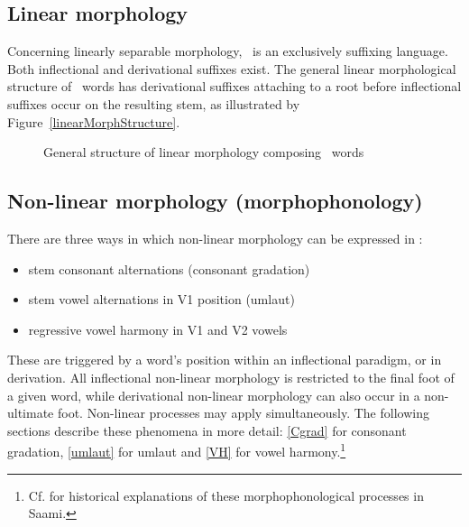 \FB

\subsection{Linear morphology}\label{linearMorphology}
Concerning linearly separable morphology, \PS\ is an exclusively suffixing language. Both inflectional and derivational suffixes exist. %
The general linear morphological structure of \PS\ words has derivational suffixes attaching to a root before inflectional suffixes occur on the resulting stem, as illustrated by %
Figure~\vref{linearMorphStructure}.
\begin{figure}[h]
\caption{General structure of linear morphology composing \PS\ words}\label{linearMorphStructure}
\end{figure}
%


\subsection{Non-linear morphology (morphophonology)}\label{morphophonology}
There are three ways %
in which non-linear morphology can be expressed in \PS:
\begin{itemize}
\item{stem consonant alternations (consonant gradation)}
\item{stem vowel alternations in V1 position (umlaut)}
\item{regressive vowel harmony in V1 and V2 vowels}
\end{itemize}
These are triggered by a word’s position %
within an inflectional paradigm, or in derivation. All inflectional non-linear morphology is restricted to the final foot of a given word, while derivational non-linear morphology can also occur in a non-ultimate foot. Non-linear processes may apply simultaneously. The following sections describe these phenomena in more detail: \SEC\ref{Cgrad} for consonant gradation, \SEC\ref{umlaut} for umlaut and \SEC\ref{VH} for vowel harmony.\footnote{Cf. \citet{KorhonenM1969} for historical explanations of these morphophonological processes in Saami.} 


